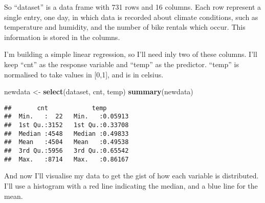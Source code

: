 \documentclass[]{article}
\newenvironment{Shaded}{\begin{snugshade}}{\end{snugshade}}
\newcommand{\KeywordTok}[1]{\textcolor[rgb]{0.13,0.29,0.53}{\textbf{#1}}}
\newcommand{\DataTypeTok}[1]{\textcolor[rgb]{0.13,0.29,0.53}{#1}}
\newcommand{\StringTok}[1]{\textcolor[rgb]{0.31,0.60,0.02}{#1}}
\newcommand{\CommentTok}[1]{\textcolor[rgb]{0.56,0.35,0.01}{\textit{#1}}}
\newcommand{\OperatorTok}[1]{\textcolor[rgb]{0.81,0.36,0.00}{\textbf{#1}}}
\newcommand{\NormalTok}[1]{#1}
\begin{document}
So ``dataset'' is a data frame with 731 rows and 16 columns. Each row
represent a single entry, one day, in which data is recorded about
climate conditions, such as temperature and humidity, and the number of
bike rentals which occur. This information is stored in the columns.

I'm building a simple linear regression, so I'll need inly two of these
columns. I'll keep ``cnt'' as the response variable and ``temp'' as the
predictor. ``temp'' is normalised to take values in {[}0,1{]}, and is in
celsius.

\begin{Shaded}
\begin{Highlighting}[]
\NormalTok{newdata <-}\StringTok{ }\KeywordTok{select}\NormalTok{(dataset, cnt, temp)}
\KeywordTok{summary}\NormalTok{(newdata)}
\end{Highlighting}
\end{Shaded}

\begin{verbatim}
##       cnt            temp        
##  Min.   :  22   Min.   :0.05913  
##  1st Qu.:3152   1st Qu.:0.33708  
##  Median :4548   Median :0.49833  
##  Mean   :4504   Mean   :0.49538  
##  3rd Qu.:5956   3rd Qu.:0.65542  
##  Max.   :8714   Max.   :0.86167
\end{verbatim}

And now I'll visualise my data to get the gist of how each variable is
distributed. I'll use a histogram with a red line indicating the median,
and a blue line for the mean.

\begin{Shaded}
\end{Shaded}
\end{document}
